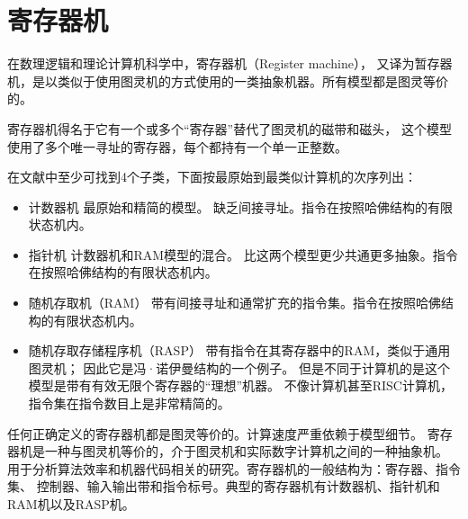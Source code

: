 \section{寄存器机}
在数理逻辑和理论计算机科学中，寄存器机（Register machine），
又译为暂存器机，是以类似于使用图灵机的方式使用的一类抽象机器。所有模型都是图灵等价的。

寄存器机得名于它有一个或多个``寄存器''替代了图灵机的磁带和磁头，
这个模型使用了多个唯一寻址的寄存器，每个都持有一个单一正整数。

在文献中至少可找到4个子类，下面按最原始到最类似计算机的次序列出：
\begin{itemize}
        \item 计数器机 最原始和精简的模型。
                缺乏间接寻址。指令在按照哈佛结构的有限状态机内。
        \item 指针机 计数器机和RAM模型的混合。
                比这两个模型更少共通更多抽象。指令在按照哈佛结构的有限状态机内。
        \item 随机存取机（RAM） 带有间接寻址和通常扩充的指令集。指令在按照哈佛结构的有限状态机内。
        \item 随机存取存储程序机（RASP） 带有指令在其寄存器中的RAM，类似于通用图灵机；
                因此它是冯·诺伊曼结构的一个例子。
                但是不同于计算机的是这个模型是带有有效无限个寄存器的“理想”机器。
                不像计算机甚至RISC计算机，指令集在指令数目上是非常精简的。
\end{itemize}

任何正确定义的寄存器机都是图灵等价的。计算速度严重依赖于模型细节。
寄存器机是一种与图灵机等价的，介于图灵机和实际数字计算机之间的一种抽象机。
用于分析算法效率和机器代码相关的研究。寄存器机的一般结构为：寄存器、指令集、
控制器、输入输出带和指令标号。典型的寄存器机有计数器机、指针机和RAM机以及RASP机。

